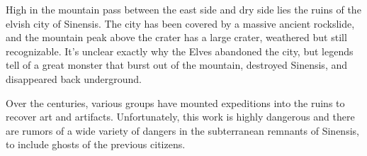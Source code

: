 High in the mountain pass between the east side and dry side lies the ruins of the elvish city of Sinensis.
The city has been covered by a massive ancient rockslide, and the mountain peak above the crater has a large crater, weathered but still recognizable.
It's unclear exactly why the Elves abandoned the city, but legends tell of a great monster that burst out of the mountain, destroyed Sinensis, and disappeared back underground.

Over the centuries, various groups have mounted expeditions into the ruins to recover art and artifacts.
Unfortunately, this work is highly dangerous and there are rumors of a wide variety of dangers in the subterranean remnants of Sinensis, to include ghosts of the previous citizens.
